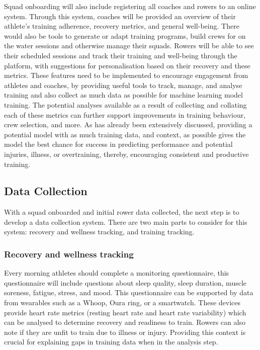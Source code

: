 Squad onboarding will also include registering all coaches and rowers to an online system. Through this system, coaches will be provided an overview of their athlete's training adherence, recovery metrics, and general well-being. There would also be tools to generate or adapt training programs, build crews for on the water sessions and otherwise manage their squads. Rowers will be able to see their scheduled sessions and track their training and well-being through the platform, with suggestions for personalisation based on their recovery and these metrics. These features need to be implemented to encourage engagement from athletes and coaches, by providing useful tools to track, manage, and analyse training and also collect as much data as possible for machine learning model training. The potential analyses available as a result of collecting and collating each of these metrics can further support improvements in training behaviour, crew selection, and more. As has already been extensively discussed, providing a potential model with as much training data, and context, as possible gives the model the best chance for success in predicting performance and potential injuries, illness, or overtraining, thereby, encouraging consistent and productive training. 

\subsection{\label{sub:ideal-data-collection}Data Collection}
With a squad onboarded and initial rower data collected, the next step is to develop a data collection system. There are two main parts to consider for this system: recovery and wellness tracking, and training tracking.

\subsubsection{Recovery and wellness tracking}
Every morning athletes should complete a monitoring questionnaire, this questionnaire will include questions about sleep quality, sleep duration, muscle soreness, fatigue, stress, and mood. This questionnaire can be supported by data from wearables such as a Whoop, Oura ring, or a smartwatch. These devices provide heart rate metrics (resting heart rate and heart rate variability) which can be analysed to determine recovery and readiness to train. Rowers can also note if they are unfit to train due to illness or injury. Providing this context is crucial for explaining gaps in training data when in the analysis step.

